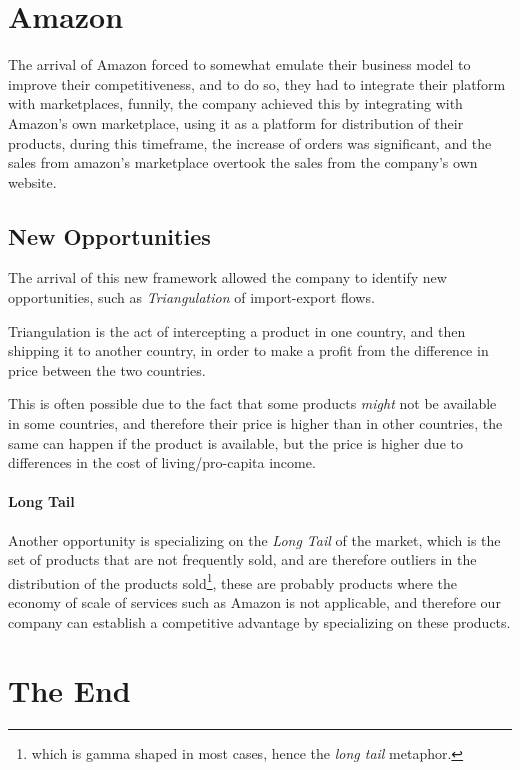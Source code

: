 \documentclass[openright, twoside, twocolumn, a4paper, 10pt]{report}
\begin{document}
\section{Amazon}
The arrival of Amazon forced to somewhat emulate their business model to improve their competitiveness, and to do so, they had to
integrate their platform with marketplaces, funnily, the company achieved this by integrating with Amazon's own marketplace, using
it as a platform for distribution of their products, during this timeframe, the increase of orders was significant, and the sales
from amazon's marketplace overtook the sales from the company's own website.

\subsection{New Opportunities}

The arrival of this new framework allowed the company to identify new opportunities, such as \emph{Triangulation} of
import-export flows.

\begin{definition}[Triangulation]
	Triangulation is the act of intercepting a product in one country, and then shipping it to another country, in order to
	make a profit from the difference in price between the two countries.

	This is often possible due to the fact that some products \emph{might} not be available in some countries, and therefore
	their price is higher than in other countries, the same can happen if the product is available, but the price is higher due to
	differences in the cost of living/pro-capita income.
\end{definition}

\paragraph{Long Tail}
Another opportunity is specializing on the \emph{Long Tail} of the market, which is the set of products that are not
frequently sold, and are therefore outliers in the distribution of the products sold\footnote{
	which is gamma shaped in most cases, hence the \emph{long tail} metaphor.
}, these are probably products where the economy of scale of services such as Amazon is not applicable, and therefore
our company can establish a competitive advantage by specializing on these products.

\section{The End}
\end{document}
